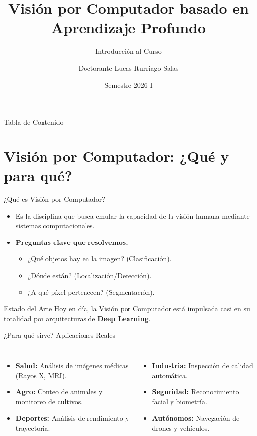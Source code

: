\documentclass[10pt]{beamer}
\title[Visión por Computador]{Visión por Computador basado en Aprendizaje Profundo}
\subtitle{Introducción al Curso}
\author[Lucas Iturriago]{Doctorante Lucas Iturriago Salas}
\institute[UNAL]{Universidad Nacional de Colombia \\ Sede Manizales \\ Facultad de Ingeniería y Arquitectura}
\date{Semestre 2026-I}
\begin{document}
\begin{frame}
    \titlepage
\end{frame}

\begin{frame}{Tabla de Contenido}
    \tableofcontents
\end{frame}

\section{Visión por Computador: ¿Qué y para qué?}

\begin{frame}{¿Qué es Visión por Computador?}
    \begin{itemize}
        \item Es la disciplina que busca emular la capacidad de la visión humana mediante sistemas computacionales.
        \item \textbf{Preguntas clave que resolvemos:}
        \begin{itemize}
            \item ¿Qué objetos hay en la imagen? (Clasificación).
            \item ¿Dónde están? (Localización/Detección).
            \item ¿A qué píxel pertenecen? (Segmentación).
        \end{itemize}
    \end{itemize}
    \begin{exampleblock}{Estado del Arte}
        Hoy en día, la Visión por Computador está impulsada casi en su totalidad por arquitecturas de \textbf{Deep Learning}.
    \end{exampleblock}
\end{frame}

\begin{frame}{¿Para qué sirve? Aplicaciones Reales}
    \begin{columns}
        \begin{itemize}
            \item \textbf{Salud:} Análisis de imágenes médicas (Rayos X, MRI).
            \item \textbf{Agro:} Conteo de animales y monitoreo de cultivos.
            \item \textbf{Deportes:} Análisis de rendimiento y trayectoria.
        \end{itemize}
        \begin{itemize}
            \item \textbf{Industria:} Inspección de calidad automática.
            \item \textbf{Seguridad:} Reconocimiento facial y biometría.
            \item \textbf{Autónomos:} Navegación de drones y vehículos.
        \end{itemize}
    \end{columns}
\end{frame}
\end{document}

